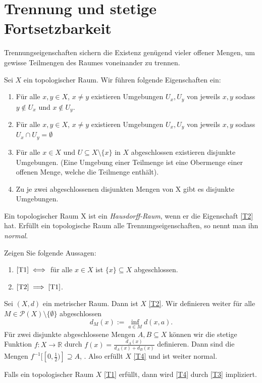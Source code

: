 \documentclass[
12pt, 
openany, 
a4paper, 
final,
fleqn, 
]{myclass}
\numberwithin{equation}{chapter}
\numberwithin{section}{chapter}
\newcommand{\RR}{\mathbb R}
\newcommand{\powerset}[1]{\mathcal P\left(#1\right)}
\newcommand{\todo}[1]{}
\begin{document}
\section{Trennung und stetige Fortsetzbarkeit}
Trennungseigenschaften sichern die Existenz genügend vieler offener Mengen, um gewisse
Teilmengen des Raumes voneinander zu trennen.
\begin{defn}
Sei $X$ ein topologischer Raum. Wir führen folgende Eigenschaften ein: 
\begin{enumerate}[label={\normalfont\textbf{T\arabic*}}]
\item\label{T1} Für alle $x, y\in X$, $x\neq y$ existieren Umgebungen $U_x, U_y$ von jeweils $x, y$ sodass $y\notin U_x$ und $x\notin U_y$. 
\item\label{T2} Für alle $x, y\in X$, $x\neq y$ existieren Umgebungen $U_x, U_y$ von jeweils $x, y$ sodass $U_x \cap U_y = \emptyset$
\item\label{T3} Für alle $x\in X$ und $U\subseteq X\setminus\{x\}$ in $X$ abgeschlossen existieren disjunkte Umgebungen. (Eine Umgebung einer Teilmenge ist eine Obermenge einer offenen Menge, welche die Teilmenge enthält). 

\item\label{T4} Zu je zwei abgeschlossenen disjunkten Mengen von X gibt es disjunkte Umgebungen.
\end{enumerate}
Ein topologischer Raum X ist ein \emph{Hausdorff-Raum}, wenn er die Eigenschaft \ref{T2} hat. Erfüllt
ein topologische Raum alle Trennungseigenschaften, so nennt man ihn \emph{normal}.
\end{defn}
\begin{ex}
Zeigen Sie folgende Aussagen: 
\begin{enumerate}[label=(\arabic*)]
\item $\ref{T1}\iff$ für alle $x\in X$ ist $\{x\} \subseteq X$ abgeschlossen.
\item $\ref{T2} \implies \ref{T1}$. 
\end{enumerate}
\end{ex}

\begin{eg}\label{eg:Urysohnfkt}
Sei $(X, d)$ ein metrischer Raum. Dann ist $X$ \ref{T2}. Wir definieren weiter für alle $M\in \powerset{X}\setminus\{\emptyset\}$ abgeschlossen
\[
d_M(x) := \inf_{a\in M} d(x, a). 
\]
Für zwei disjunkte abgeschlossene Mengen $A, B\subseteq X$ können wir die stetige Funktion $f: X \to \RR$ durch $f(x) = \frac{d_A(x)}{d_A(x)+d_B(x)}$ definieren. Dann sind die Mengen $f^{-1}[[0, \frac{1}{2})] \supseteq A$, \todo{überprüfen...}. Also erfüllt $X$ \ref{T4} und ist weiter normal. 
\end{eg}
\begin{rmk}
Falls ein topologischer Raum $X$ \ref{T1} erfüllt, dann wird \ref{T4} durch \ref{T3} impliziert. 
\end{rmk}
\end{document}
